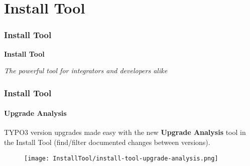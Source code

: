 %

\section{Install Tool}
\begin{frame}[fragile]
	\frametitle{Install Tool}

	\begin{center}\huge{\color{typo3darkgrey}\textbf{Install Tool}}\end{center}
	\begin{center}\large{\textit{The powerful tool for integrators and developers alike}}\end{center}

\end{frame}


\begin{frame}[fragile]
	\frametitle{Install Tool}
	\framesubtitle{Upgrade Analysis}


	TYPO3 version upgrades made easy with the new \textbf{Upgrade Analysis} tool
	in the Install Tool (find/filter documented changes between versions).

	\begin{figure}
		\texttt{[image: InstallTool/install-tool-upgrade-analysis.png]}
	\end{figure}

\end{frame}

